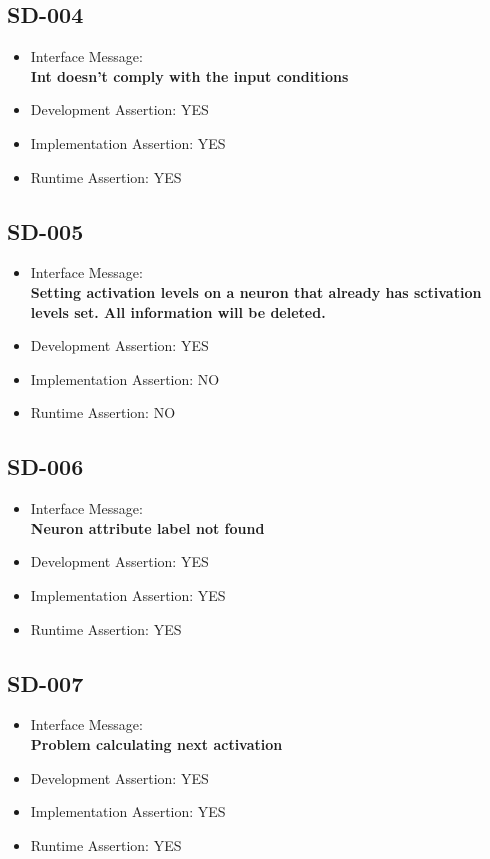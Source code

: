 \subsection{SD-004}
\begin{itemize}
  \item Interface Message:\\[1em]
    \textbf{Int doesn't comply with the input conditions}
  \item Development Assertion: YES
  \item Implementation Assertion: YES
  \item Runtime Assertion: YES
\end{itemize}

\subsection{SD-005}
\begin{itemize}
  \item Interface Message:\\[1em]
    \textbf{Setting activation levels on a neuron that already has sctivation levels set. All information will be deleted.}
  \item Development Assertion: YES
  \item Implementation Assertion: NO
  \item Runtime Assertion: NO
\end{itemize}

\subsection{SD-006}
\begin{itemize}
  \item Interface Message:\\[1em]
    \textbf{Neuron attribute label not found}
  \item Development Assertion: YES
  \item Implementation Assertion: YES
  \item Runtime Assertion: YES
\end{itemize}

\subsection{SD-007}
\begin{itemize}
  \item Interface Message:\\[1em]
    \textbf{Problem calculating next activation}
  \item Development Assertion: YES
  \item Implementation Assertion: YES
  \item Runtime Assertion: YES
\end{itemize}

